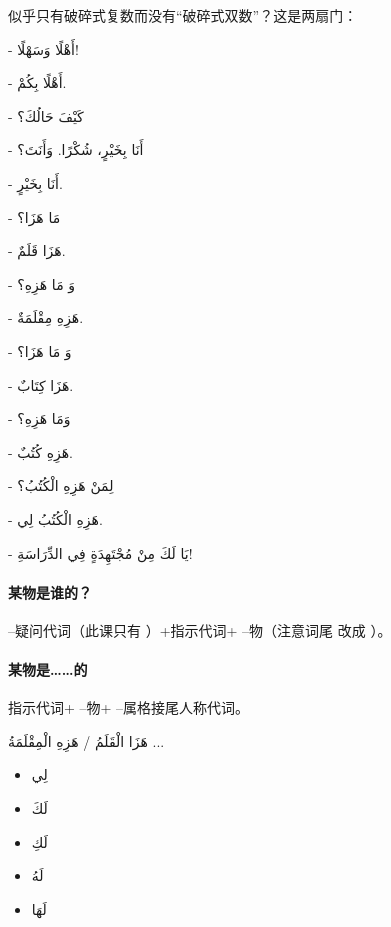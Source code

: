 \begin{note}
    似乎只有破碎式复数而没有``破碎式双数''？这是两扇门：
\end{note}

\begin{Arabic}
    - أَهْلًا وَسَهْلًا!

    - أَهْلًا بِكُمْ.

    - كَيْفَ حَالُكَ؟

    - أَنَا بِخَيْرٍ، شُكْرًا. وَأَنَتَ؟

    - أَنَا بِخَيْرٍ.

    - مَا هَزَا؟

    - هَزَا قَلَمٌ.

    - وَ مَا هَزِهِ؟

    - هَزِهِ مِقْلَمَةٌ.

    - وَ مَا هَزَا؟

    - هَزَا كِتَابٌ.

    - وَمَا هَزِهِ؟

    - هَزِهِ كُتُبٌ.

    - لِمَنْ هَزِهِ الْكُتُبُ؟

    - هَزِهِ الْكُتُبُ لِي.

    - يَا لَكَ مِنْ مُجْتَهِدَةٍ فِي الدِّرَاسَةِ!
\end{Arabic}

\paragraph{某物是谁的？} --疑问代词（此课只有 ）+指示代词+ --物（注意词尾 改成 ）。

\paragraph{某物是……的} 指示代词+ --物+ --属格接尾人称代词。

\begin{Arabic}
    هَزَا الْقَلَمُ / هَزِهِ الْمِقْلَمَةُ ...
    \begin{itemize}
        \item لِي
        \item لَكَ
        \item لَكِ
        \item لَهُ
        \item لَهَا
    \end{itemize}
\end{Arabic}

